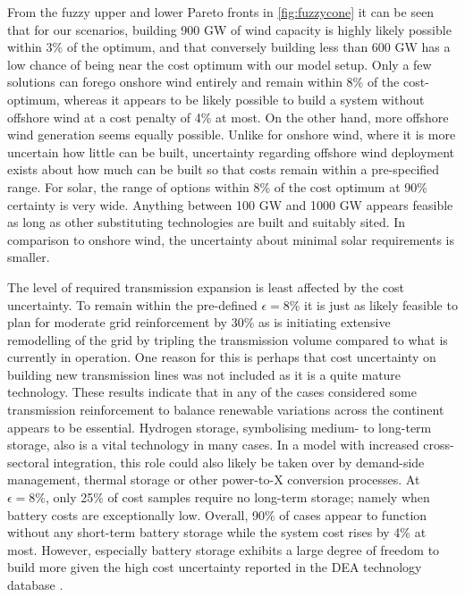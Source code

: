 From the fuzzy upper and lower Pareto fronts in \cref{fig:fuzzycone} it can be
seen that for our scenarios, building 900 GW of wind capacity is highly likely
possible within 3\% of the optimum, and that conversely building less than 600
GW has a low chance of being near the cost optimum with our model setup. Only a
few solutions can forego onshore wind entirely and remain within 8\% of the
cost-optimum, whereas it appears to be likely possible to build a system without
offshore wind at a cost penalty of 4\% at most. On the other hand, more offshore
wind generation seems equally possible. Unlike for onshore wind, where it is more
uncertain how little can be built, uncertainty regarding offshore wind
deployment exists about how much can be built so that costs remain within a
pre-specified range. For solar, the range of options within 8\% of the cost
optimum at 90\% certainty is very wide. Anything between 100 GW and 1000 GW
appears feasible as long as other substituting technologies are built and
suitably sited. In comparison to onshore wind, the uncertainty about minimal
solar requirements is smaller.

The level of required transmission expansion is least affected by the cost
uncertainty. To remain within the pre-defined $\epsilon=8\%$ it is just as
likely feasible to plan for moderate grid reinforcement by 30\% as is initiating
extensive remodelling of the grid by tripling the transmission volume compared
to what is currently in operation. One reason for this is perhaps that cost
uncertainty on building new transmission lines was not included as it is a quite
mature technology. These results indicate that in any of the cases considered
some transmission reinforcement to balance renewable variations across the
continent appears to be essential. Hydrogen storage, symbolising medium- to
long-term storage, also is a vital technology in many cases. In a model with
increased cross-sectoral integration, this role could also likely be taken over
by demand-side management, thermal storage or other power-to-X conversion
processes. At $\epsilon=8\%$, only 25\% of cost samples require no long-term
storage; namely when battery costs are exceptionally low. Overall, 90\% of cases
appear to function without any short-term battery storage while the system cost
rises by 4\% at most. However, especially battery storage exhibits a large
degree of freedom to build more given the high cost uncertainty reported in the
DEA technology database \cite{DEA}.


